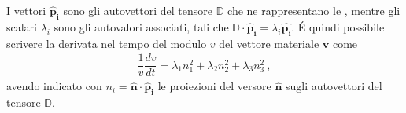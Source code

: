 \documentclass[letterpaper,10pt,italian]{jupyterBook}
\begin{document}
\sphinxAtStartPar
I vettori \(\mathbf{\hat{p}_i}\) sono gli autovettori del tensore \(\mathbb{D}\)
che ne rappresentano le , mentre gli scalari
\(\lambda_i\) sono gli autovalori associati, tali che
\(\mathbb{D} \cdot \mathbf{\hat{p}_i} = \lambda_i \mathbf{\hat{p_i}}\). É quindi
possibile scrivere la derivata nel tempo del modulo \(v\) del vettore
materiale \(\mathbf{v}\) come
\begin{equation*}
\begin{split}\dfrac{1}{v} \dfrac{d v}{d t} = \lambda_1 n_1^2 +  \lambda_2 n_2^2 +  \lambda_3 n_3^2 \ ,\end{split}
\end{equation*}
\sphinxAtStartPar
avendo indicato con \(n_i = \mathbf{\hat{n}} \cdot \mathbf{\hat{p}_i}\) le
proiezioni del versore \(\mathbf{\hat{n}}\) sugli autovettori del tensore
\(\mathbb{D}\).
\end{document}
